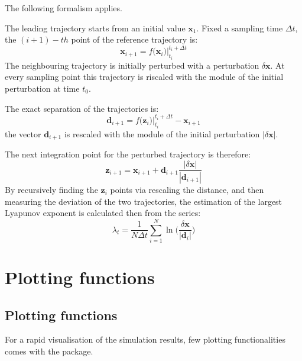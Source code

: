 \documentclass[letterpaper,10pt,english,openany,oneside]{sphinxmanual}
\begin{document}
The following formalism applies.

The leading trajectory starts from an initial value \(\mathbf{x}_1\). Fixed a sampling time \(\Delta t\), the \((i+1)-th\) point of the reference trajectory is:
\begin{equation}
\mathbf{x}_{i+1} = f\big(\mathbf{x}_{i}\big) \Big \rvert_{t_i}^{t_{i} + \Delta t}
\end{equation}
The neighbouring trajectory is initially perturbed with a perturbation \(\delta \mathbf{x}\). At every sampling point this trajectory is riscaled with the module of the initial perturbation at time \(t_0\).

The exact separation of the trajectories is:
\begin{equation}
\mathbf{d}_{i+1} = f\big(\mathbf{z}_{i}\big) \Big \rvert_{t_i}^{t_{i} + \Delta t}- \mathbf{x}_{i+1}
\end{equation}
the vector \(\mathbf{d}_{i+1}\) is re\sphinxhyphen{}scaled with the module of the initial perturbation \(|\delta \mathbf{x}|\).

The next integration point for the perturbed trajectory is therefore:
\begin{equation}
\mathbf{z}_{i+1} = \mathbf{x}_{i+1} + \mathbf{d}_{i+1} \frac{|\delta \mathbf{x}|}{|\mathbf{d}_{i+1}|}
\end{equation}
By recursively finding the \(\mathbf{z}_{i}\) points via rescaling the distance, and then measuring the deviation of the two trajectories, the estimation of the largest Lyapunov exponent is calculated then from the series:
\begin{equation}
\lambda_{t} = \frac{1}{N \Delta t} \sum_{i=1}^{N} \ln \Big(\frac{\delta \mathbf{x}}{|\mathbf{d}_{i}|}\Big)
\end{equation}

\chapter{Plotting functions}
\label{\detokenize{plotting/index:plotting-functions}}\label{\detokenize{plotting/index::doc}}

\section{Plotting functions}
\label{\detokenize{plotting/plotting:plotting-functions}}\label{\detokenize{plotting/plotting::doc}}
For a rapid visualisation of the simulation results, few plotting functionalities comes with the package.
\end{document}

